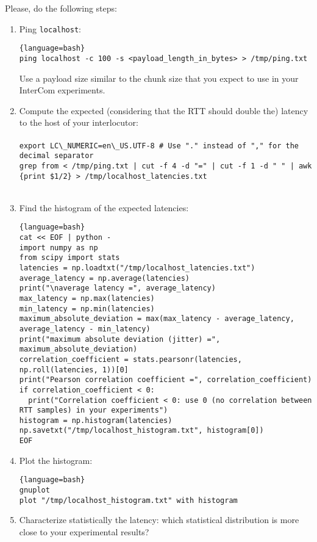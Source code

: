 Please, do the following steps:

\begin{enumerate}
\item Ping \verb|localhost|:
   \begin{lstlisting}{language=bash}
ping localhost -c 100 -s <payload_length_in_bytes> > /tmp/ping.txt
  \end{lstlisting}
  Use a payload size similar to the chunk size that you expect to use
  in your InterCom experiments.
\item Compute the expected (considering that the RTT should
  double the) latency to the host of your interlocutor:\\\\
  \verb|export LC\_NUMERIC=en\_US.UTF-8 # Use "." instead of "," for the decimal separator|\\
\texttt{grep from < /tmp/ping.txt | cut -f 4 -d "=" | cut -f 1 -d " " | awk
  \textquotesingle\{print \$1/2\}\textquotesingle~> /tmp/localhost\_latencies.txt}\\\\

\item Find the histogram of the expected latencies:
  
  \begin{lstlisting}{language=bash}
cat << EOF | python -
import numpy as np
from scipy import stats
latencies = np.loadtxt("/tmp/localhost_latencies.txt")
average_latency = np.average(latencies)
print("\naverage latency =", average_latency)
max_latency = np.max(latencies)
min_latency = np.min(latencies)
maximum_absolute_deviation = max(max_latency - average_latency, average_latency - min_latency)
print("maximum absolute deviation (jitter) =", maximum_absolute_deviation)
correlation_coefficient = stats.pearsonr(latencies, np.roll(latencies, 1))[0]
print("Pearson correlation coefficient =", correlation_coefficient)
if correlation_coefficient < 0:
  print("Correlation coefficient < 0: use 0 (no correlation between RTT samples) in your experiments")
histogram = np.histogram(latencies)
np.savetxt("/tmp/localhost_histogram.txt", histogram[0])
EOF
  \end{lstlisting}

\item Plot the histogram:
  \begin{lstlisting}{language=bash}
gnuplot
plot "/tmp/localhost_histogram.txt" with histogram
  \end{lstlisting}
  
\item Characterize statistically the latency: which statistical
  distribution is more close to your experimental results?
\end{enumerate}

